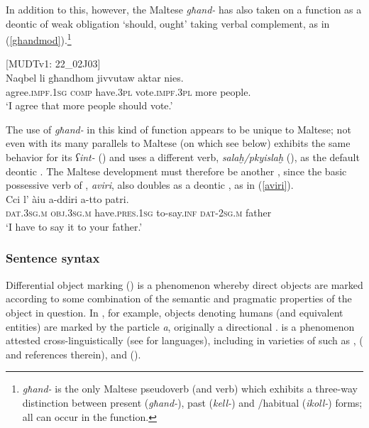 \documentclass[output=paper]{langsci/langscibook}
\begin{document}
In addition to this, however, the Maltese \textit{għand-} has also taken on a function as a deontic  of weak obligation `should, ought' taking verbal complement, as in (\ref{ghandmod}).\footnote{\textit{għand-} is the only Maltese pseudoverb (and verb) which exhibits a three-way distinction between present (\textit{għand-}), past (\textit{kell-}) and /habitual (\textit{ikoll-}) forms; all can occur in the  function.}

\ea\label{ghandmod}
{[MUDTv1: 22\_02J03]} \\
    \gll Naqbel	li għandhom jivvutaw aktar nies.\\
	agree.\textsc{impf.1sg} \textsc{comp} have.\textsc{3pl} vote.\textsc{impf.3pl} more people.\\
	\glt `I agree that more people should vote.'\\
\z

The use of \textit{għand-} in this kind of  function appears to be unique to Maltese; not even   with its many parallels to Maltese (on which see below) exhibits the same behavior for its  \textit{ʕint-} (\citealt[346]{Borg2004}) and uses a different verb, \textit{salaḫ/pkyislaḫ} (\citealt[323]{Borg2004}), as the default deontic . The Maltese development must therefore be another , since the basic possessive verb of , \textit{aviri}, also doubles as a deontic , as in (\ref{aviri}).
\ea\label{aviri}
    \\
    \gll Cci l' àiu a-ddiri a-tto patri.\\
	\textsc{dat.3sg.m} \textsc{obj.3sg.m} have.\textsc{pres.1sg} to-say.\textsc{inf} \textsc{dat-2sg.m} father\\
	\glt `I have to say it to your father.'\\
\z

\subsubsection{Sentence syntax}
Differential object marking () is a phenomenon whereby direct objects are marked according to some combination of the semantic and pragmatic properties of the object in question. In , for example, objects denoting humans (and equivalent entities) are marked by the particle \textit{a}, originally a directional .  is a phenomenon attested cross-linguistically (see \citealt{Khan1984} for  languages), including in varieties of  such as ,  (\citealt{Coghill2014} and references therein), and  (\citealt[108]{Andalusi2013}).
\end{document}
